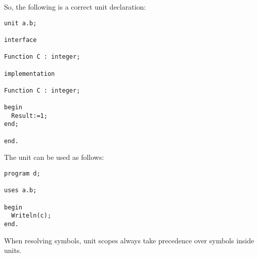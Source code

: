So, the following is a correct unit declaration:
\begin{verbatim}
unit a.b;

interface 

Function C : integer;

implementation

Function C : integer;

begin
  Result:=1;
end;

end.
\end{verbatim}
The unit can be used as follows:
\begin{verbatim}
program d;

uses a.b;

begin
  Writeln(c);
end.
\end{verbatim}
When resolving symbols, unit scopes always take precedence over symbols inside units.

